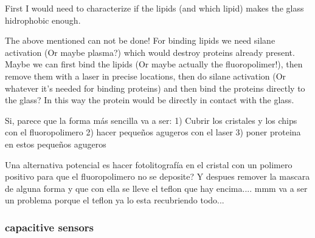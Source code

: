 \documentclass[10pt, twocolumn]{article}
\newcommand\wordcount{
   \immediate\write18{wordcount.bat \jobname.tex}
   
}
\begin{document}
 First I would need to characterize if the lipids (and which lipid) makes the glass hidrophobic enough.

 The above mentioned can not be done! For binding lipids we need silane activation (Or maybe plasma?) which would destroy proteins already present.
 Maybe we can first bind the lipids (Or maybe actually the fluoropolimer!), then remove them with a laser in precise locations, then do silane activation 
 (Or whatever it's needed for binding proteins) and then bind the proteins directly to the glass? In this way the protein would be directly in contact with the glass.


 Si, parece que la forma más sencilla va a ser:
 1) Cubrir los cristales y los chips con el fluoropolimero
 2) hacer pequeños agugeros con el laser
 3) poner proteina en estos pequeños agugeros
 
 Una alternativa potencial es hacer fotolitografía en el cristal con un polimero positivo para que el fluoropolimero no se deposite?
 Y despues remover la mascara de alguna forma y que con ella se lleve el teflon que hay encima.... mmm va a ser un problema porque el teflon ya lo esta recubriendo todo...


 \subsubsection*{capacitive sensors}


\wordcount

\newpage


\end{document}

